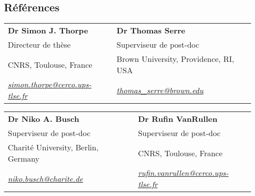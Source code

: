 \documentclass[margin,line]{resume}
\begin{document}
\begin{resume}
\vspace{3mm}
\section{\mysidestyle Références} 

	\begin{tabular}{@{}p{6cm}p{6cm}}
	\textbf{Dr Simon J. Thorpe}       &  \textbf{Dr Thomas Serre}                   \\
	Directeur de thèse                              &  Superviseur de post-doc                       \\
	CNRS, Toulouse, France          &  Brown University, Providence, RI, USA        \\
	\textsl{\href{mailto:simon.thorpe@cerco.ups-tlse.fr}{simon.thorpe@cerco.ups-tlse.fr}}   &  
	\textsl{\href{mailto:thomas_serre@brown.edu}{thomas\_serre@brown.edu}}    \\
	\end{tabular}
	
	\begin{tabular}{@{}p{6cm}p{6cm}}
	\textbf{Dr Niko A. Busch}       &  \textbf{Dr Rufin VanRullen}                   \\
	Superviseur de post-doc                   &  Superviseur de post-doc                       \\
	Charité University, Berlin, Germany         &  CNRS, Toulouse, France        \\
	\textsl{\href{mailto:niko.busch@charite.de}{niko.busch@charite.de}}  &  
	\textsl{\href{mailto:rufin.vanrullen@cerco.ups-tlse.fr}{rufin.vanrullen@cerco.ups-tlse.fr}}    \\
	\end{tabular}


	
\end{resume}
\end{document}
